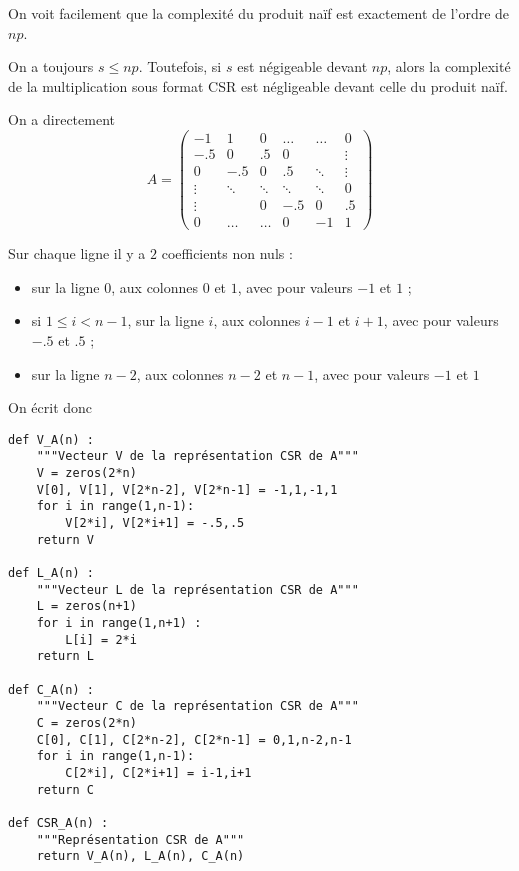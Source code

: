 \question{} 
On voit facilement que la complexité du produit naïf est exactement de l'ordre de $np$. 

On a toujours $s \leq np$. Toutefois, si $s$ est négigeable devant $np$, alors la complexité de la multiplication sous format CSR est négligeable devant celle du produit naïf. 

\question{}
On a directement 
\begin{equation*}
    A = \begin{pmatrix}
            -1     & 1      & 0      & \dots  & \dots  & 0\\
            -.5    & 0      & .5     & 0      &        & \vdots \\
            0      & -.5    &   0    & .5     & \ddots & \vdots \\
            \vdots & \ddots & \ddots & \ddots & \ddots & 0 \\
            \vdots &        & 0      & -.5    & 0      & .5 \\
            0      & \dots  & \dots  & 0      & -1     & 1    
        \end{pmatrix}
\end{equation*}

\question{}
Sur chaque ligne il y a $2$ coefficients non nuls : 
\begin{itemize}
    \item sur la ligne \no$0$, aux colonnes $0$ et $1$, avec pour valeurs $-1$ et $1$ ; 
    \item si $1 \leq i < n-1$, sur la ligne \no$i$, aux colonnes $i-1$ et $i+1$, avec pour valeurs $-.5$ et $.5$ ; 
    \item sur la ligne \no$n-2$, aux colonnes $n-2$ et $n-1$, avec pour valeurs $-1$ et $1$
\end{itemize}
On écrit donc 
\begin{lstlisting}
def V_A(n) :
    """Vecteur V de la représentation CSR de A"""
    V = zeros(2*n)
    V[0], V[1], V[2*n-2], V[2*n-1] = -1,1,-1,1
    for i in range(1,n-1):
        V[2*i], V[2*i+1] = -.5,.5
    return V

def L_A(n) :
    """Vecteur L de la représentation CSR de A"""
    L = zeros(n+1)
    for i in range(1,n+1) :
        L[i] = 2*i
    return L

def C_A(n) :
    """Vecteur C de la représentation CSR de A"""
    C = zeros(2*n)
    C[0], C[1], C[2*n-2], C[2*n-1] = 0,1,n-2,n-1
    for i in range(1,n-1):
        C[2*i], C[2*i+1] = i-1,i+1
    return C

def CSR_A(n) :
    """Représentation CSR de A"""
    return V_A(n), L_A(n), C_A(n)
\end{lstlisting}
